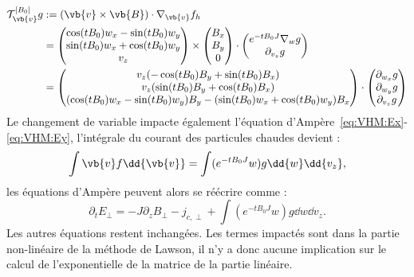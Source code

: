 \begin{equation}
  \begin{aligned}
    \mathcal{T}_{\vb{v}}^{[B_0]}g &:= (\vb{v}\times\vb{B})\cdot\nabla_{\vb{v}}f_h \\
                                  & = \begin{pmatrix}
                                    \cos(tB_0)w_x - \sin(tB_0)w_y \\
                                    \sin(tB_0)w_x + \cos(tB_0)w_y \\
                                    v_z
                                  \end{pmatrix}
                                  \times
                                  \begin{pmatrix}
                                     B_x \\ B_y \\ 0
                                  \end{pmatrix} 
                                  \cdot
                                  \begin{pmatrix}
                                    e^{-tB_0J}\nabla_w g \\
                                    \partial_{v_z}g
                                  \end{pmatrix} \\
                                  & = \begin{pmatrix}
                                    v_z(-\cos(tB_0)B_y + \sin(tB_0)B_x) \\
                                    v_z(\sin(tB_0)B_y + \cos(tB_0)B_x) \\
                                    (\cos(tB_0)w_x-\sin(tB_0)w_y)B_y - (\sin(tB_0)w_x+\cos(tB_0)w_y)B_x
                                  \end{pmatrix}
                                  \cdot
                                  \begin{pmatrix}
                                    \partial_{w_x}g \\
                                    \partial_{w_y}g \\
                                    \partial_{v_z}g
                                  \end{pmatrix}
  \end{aligned}
\end{equation}
Le changement de variable impacte également l'équation d'Ampère~\eqref{eq:VHM:Ex}-\eqref{eq:VHM:Ey}, l'intégrale du courant des particules chaudes devient :
$$
  \int\vb{v}f\dd{\vb{v}} = \int(e^{-tB_0J}w)g\dd{w}\dd{v_z},
$$
les équations d'Ampère peuvent alors se réécrire comme :
\begin{equation}
  \partial_t E_\perp = -J\partial_z B_\perp - j_{c,\perp} + \int (e^{-tB_0J}w)g\dd{w}\dd{v_z}.
\end{equation}
Les autres équations restent inchangées. Les termes impactés sont dans la partie non-linéaire de la méthode de Lawson, il n'y a donc aucune implication sur le calcul de l'exponentielle de la matrice de la partie linéaire.

